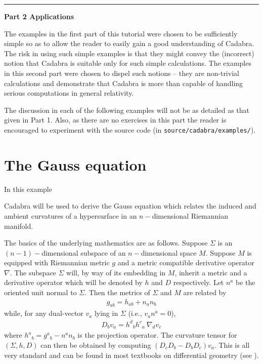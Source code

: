 \documentclass[a4paper,12pt]{article}
\numberwithin{equation}{section}%
\begin{document}
\clearpage

\hrule height 0pt
\vskip 4cm
{\Huge\bf Part 2 Applications}
\vskip 2cm

The examples in the first part of this tutorial were chosen to be sufficiently simple so as
to allow the reader to easily gain a good understanding of Cadabra. The risk in using such
simple examples is that they might convey the (incorrect) notion that Cadabra is suitable
only for such simple calculations. The examples in this second part were chosen to dispel
such notions -- they are non-trivial calculations and demonstrate that Cadabra is more than
capable of handling serious computations in general relativity.

The discussion in each of the following examples will not be as detailed as that given in
Part 1. Also, as there are no exercises in this part the reader is encouraged to experiment
with the source code (in \verb|source/cadabra/examples/|).

\clearpage

\section{The Gauss equation}
\label{sec:ex-09}
\setcounter{ExerciseNum}{0}



\hypertarget{GaussEqtn}{In this example} Cadabra will be used to derive the Gauss equation
which relates the induced and ambient curvatures of a hypersurface in an $n-$dimensional
Riemannian manifold.

The basics of the underlying mathematics are as follows. Suppose $\Sigma$ is an
$(n-1)-$dimensional subspace of an $n-$dimensional space $M$. Suppose $M$ is equipped with
Riemannian metric $g$ and a metric compatible derivative operator $\nabla$. The subspace
$\Sigma$ will, by way of its embedding in $M$, inherit a metric and a derivative operator
which will be denoted by $h$ and $D$ respectively. Let $n^a$ be the oriented unit normal to
$\Sigma$. Then the metrics of $\Sigma$ and $M$ are related by
\begin{align*}
   g_{a b} = h_{a b} + n_{a} n_{b}
\end{align*}
while, for any dual-vector $v_a$ lying in $\Sigma$ (i.e., $v_a n^a=0$),
\begin{align*}
   D_{b} v_{a} = h^{d}{}_{b} h^{c}{}_{a} \> \nabla_{d} v_{c}
\end{align*}
where $h^{a}{}_{b} = g^{a}{}_{b} - n^{a} n_{b}$ is the projection operator. The curvature
tensor for $(\Sigma,h,D)$ can then be obtained by computing $\left(D_{c} D_{b}-D_{b}
D_{c}\right) v_{a}$. This is all very standard and can be found in most textbooks on
differential geometry (see \cite{chavel:2006-01}).
\end{document}
